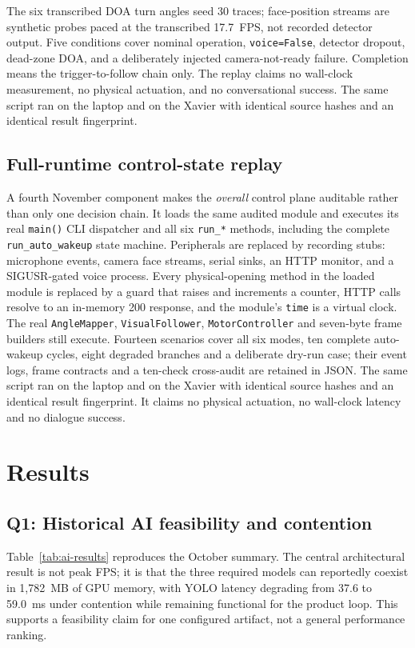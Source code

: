 \documentclass[conference]{IEEEtran}
\newcommand{\code}[1]{\texttt{#1}}
\begin{document}
The six transcribed DOA turn angles seed 30 traces; face-position streams are synthetic probes paced at the transcribed 17.7~FPS, not recorded detector output. Five conditions cover nominal operation, \code{voice=False}, detector dropout, dead-zone DOA, and a deliberately injected camera-not-ready failure. Completion means the trigger-to-follow chain only. The replay claims no wall-clock measurement, no physical actuation, and no conversational success. The same script ran on the laptop and on the Xavier with identical source hashes and an identical result fingerprint.

\subsection{Full-runtime control-state replay}
A fourth November component makes the \emph{overall} control plane auditable rather than only one decision chain. It loads the same audited module and executes its real \code{main()} CLI dispatcher and all six \code{run\_*} methods, including the complete \code{run\_auto\_wakeup} state machine. Peripherals are replaced by recording stubs: microphone events, camera face streams, serial sinks, an HTTP monitor, and a SIGUSR-gated voice process. Every physical-opening method in the loaded module is replaced by a guard that raises and increments a counter, HTTP calls resolve to an in-memory 200 response, and the module's \code{time} is a virtual clock. The real \code{AngleMapper}, \code{VisualFollower}, \code{MotorController} and seven-byte frame builders still execute. Fourteen scenarios cover all six modes, ten complete auto-wakeup cycles, eight degraded branches and a deliberate dry-run case; their event logs, frame contracts and a ten-check cross-audit are retained in JSON. The same script ran on the laptop and on the Xavier with identical source hashes and an identical result fingerprint. It claims no physical actuation, no wall-clock latency and no dialogue success.

\section{Results}
\subsection{Q1: Historical AI feasibility and contention}
Table~\ref{tab:ai-results} reproduces the October summary. The central architectural result is not peak FPS; it is that the three required models can reportedly coexist in 1,782~MB of GPU memory, with YOLO latency degrading from 37.6 to 59.0~ms under contention while remaining functional for the product loop. This supports a feasibility claim for one configured artifact, not a general performance ranking.
\end{document}

